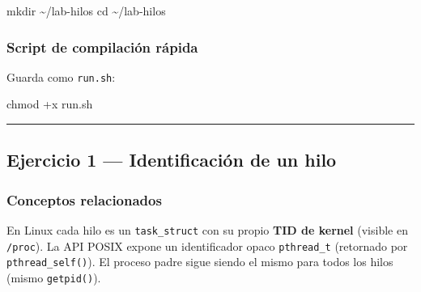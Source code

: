 \documentclass[
  spanish,
]{article}
\newenvironment{Shaded}{}{}
\newcommand{\AttributeTok}[1]{\textcolor[rgb]{0.49,0.56,0.16}{#1}}
\newcommand{\BuiltInTok}[1]{\textcolor[rgb]{0.00,0.50,0.00}{#1}}
\newcommand{\CommentTok}[1]{\textcolor[rgb]{0.38,0.63,0.69}{\textit{#1}}}
\newcommand{\ExtensionTok}[1]{#1}
\newcommand{\FunctionTok}[1]{\textcolor[rgb]{0.02,0.16,0.49}{#1}}
\newcommand{\KeywordTok}[1]{\textcolor[rgb]{0.00,0.44,0.13}{\textbf{#1}}}
\newcommand{\NormalTok}[1]{#1}
\newcommand{\StringTok}[1]{\textcolor[rgb]{0.25,0.44,0.63}{#1}}
\newcommand{\VariableTok}[1]{\textcolor[rgb]{0.10,0.09,0.49}{#1}}
\begin{document}
\begin{Shaded}
\begin{Highlighting}[]
\FunctionTok{mkdir}\NormalTok{ \textasciitilde{}/lab{-}hilos}
\BuiltInTok{cd}\NormalTok{ \textasciitilde{}/lab{-}hilos}
\end{Highlighting}
\end{Shaded}

\subsubsection{Script de compilación
rápida}\label{script-de-compilaciuxf3n-ruxe1pida}

Guarda como \texttt{run.sh}:

\begin{Shaded}
\end{Shaded}

\begin{Shaded}
\begin{Highlighting}[]
\FunctionTok{chmod}\NormalTok{ +x run.sh}
\end{Highlighting}
\end{Shaded}

\begin{center}\rule{0.5\linewidth}{0.5pt}\end{center}

\subsection{Ejercicio 1 --- Identificación de un
hilo}\label{ejercicio-1-identificaciuxf3n-de-un-hilo}

\subsubsection{Conceptos relacionados}\label{conceptos-relacionados}

En Linux cada hilo es un \texttt{task\_struct} con su propio \textbf{TID
de kernel} (visible en \texttt{/proc}). La API POSIX expone un
identificador opaco \texttt{pthread\_t} (retornado por
\texttt{pthread\_self()}). El proceso padre sigue siendo el mismo para
todos los hilos (mismo \texttt{getpid()}).
\end{document}
